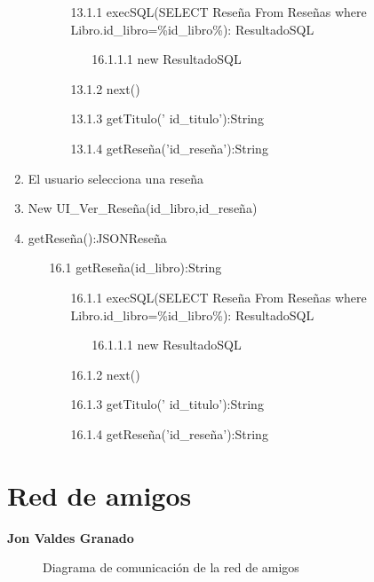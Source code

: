 ﻿\documentclass{report}
\begin{document}
\begin{enumerate}
\begin{enumerate}
                \begin{enumerate}
                    \item [13.1.1] execSQL(SELECT Reseña From Reseñas where Libro.id\_libro=\%id\_libro\%): ResultadoSQL     
                    \begin{enumerate}
                        \item [16.1.1.1] new ResultadoSQL
                    \end{enumerate}               
                    \item [13.1.2] next()
                    \item [13.1.3] getTitulo(’ id\_titulo’):String
                    \item [13.1.4] getReseña('id\_reseña'):String
                \end{enumerate}
            \end{enumerate}
            \item El usuario selecciona una reseña 
            \item New UI\_Ver\_Reseña(id\_libro,id\_reseña)
            \item getReseña():JSONReseña
            \begin{enumerate}
                \item [16.1] getReseña(id\_libro):String
                \begin{enumerate}
                    \item [16.1.1] execSQL(SELECT Reseña From Reseñas where Libro.id\_libro=\%id\_libro\%): ResultadoSQL     
                    \begin{enumerate}
                        \item [16.1.1.1] new ResultadoSQL
                    \end{enumerate}               
                    \item [16.1.2] next()
                    \item [16.1.3] getTitulo(’ id\_titulo’):String
                    \item [16.1.4] getReseña('id\_reseña'):String
                \end{enumerate}
            \end{enumerate}
         
            
            

        \end{enumerate}
        \clearpage
        \section{Red de amigos}
            \textbf{Jon Valdes Granado}
            \begin{figure}[H]
                \centering
                \caption{Diagrama de comunicación de la red de amigos}
            \end{figure}
            \clearpage
\end{document}
